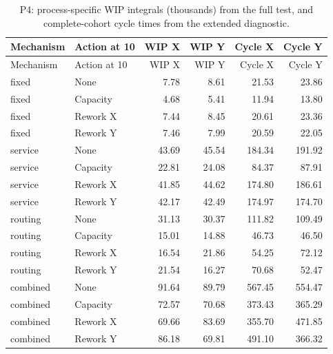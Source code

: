 \begin{longtable}{llrrrr}\caption{P4: process-specific WIP integrals (thousands) from the full test, and complete-cohort cycle times from the extended diagnostic.}\\\toprule

Mechanism & Action at 10 & WIP X & WIP Y & Cycle X & Cycle Y\\\midrule\endfirsthead

\toprule Mechanism & Action at 10 & WIP X & WIP Y & Cycle X & Cycle Y\\\midrule\endhead

fixed & None & 7.78 & 8.61 & 21.53 & 23.86\\

fixed & Capacity & 4.68 & 5.41 & 11.94 & 13.80\\

fixed & Rework X & 7.44 & 8.45 & 20.61 & 23.36\\

fixed & Rework Y & 7.46 & 7.99 & 20.59 & 22.05\\

service & None & 43.69 & 45.54 & 184.34 & 191.92\\

service & Capacity & 22.81 & 24.08 & 84.37 & 87.91\\

service & Rework X & 41.85 & 44.62 & 174.80 & 186.61\\

service & Rework Y & 42.17 & 42.49 & 174.97 & 174.70\\

routing & None & 31.13 & 30.37 & 111.82 & 109.49\\

routing & Capacity & 15.01 & 14.88 & 46.73 & 46.50\\

routing & Rework X & 16.54 & 21.86 & 54.25 & 72.12\\

routing & Rework Y & 21.54 & 16.27 & 70.68 & 52.47\\

combined & None & 91.64 & 89.79 & 567.45 & 554.47\\

combined & Capacity & 72.57 & 70.68 & 373.43 & 365.29\\

combined & Rework X & 69.66 & 83.69 & 355.70 & 471.85\\

combined & Rework Y & 86.18 & 69.81 & 491.10 & 366.32\\

\bottomrule\end{longtable}

